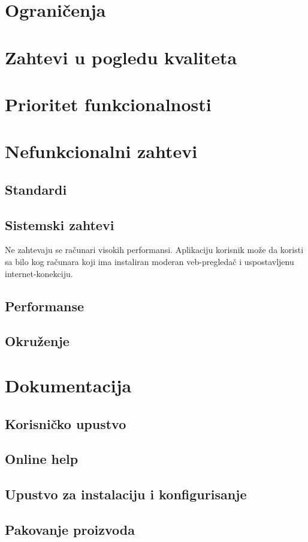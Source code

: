 \chapter{Ograničenja}




\chapter{Zahtevi u pogledu kvaliteta}




\chapter{Prioritet funkcionalnosti}




\chapter{Nefunkcionalni zahtevi}

\section{Standardi}

\section{Sistemski zahtevi}
Ne zahtevaju se računari visokih performansi. Aplikaciju korisnik može da koristi sa bilo kog računara koji ima instaliran moderan veb-pregledač i uspostavljenu internet-konekciju.

\section{Performanse}

\section{Okruženje}


\chapter{Dokumentacija}

\section{Korisničko upustvo}

\section{Online help} %

\section{Upustvo za instalaciju i konfigurisanje}

\section{Pakovanje proizvoda}
